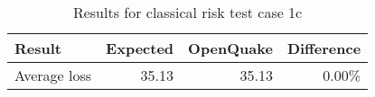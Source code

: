 \begin{table}[htbp]

\centering
\begin{tabular}{ l r r r }

\hline
\rowcolor{anti-flashwhite}
\bf{Result} & \bf{Expected} & \bf{OpenQuake} & \bf{Difference}\\
\hline
Average loss & 35.13 & 35.13 & 0.00\% \\
\hline
\end{tabular}

\caption{Results for classical risk test case 1c}
\label{tab:result-cr-1c}
\end{table}
